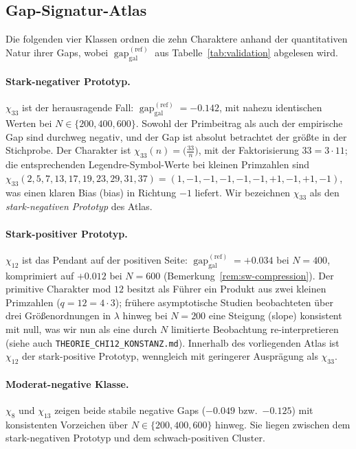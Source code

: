 \documentclass[a4paper,10pt,twocolumn]{article}
\theoremstyle{definition}
\theoremstyle{remark}
\newcommand{\gap}{\operatorname{gap}}
\newcommand{\chifn}{\chi}
\begin{document}
\subsection{Gap-Signatur-Atlas}
\label{sec:gapsig}

Die folgenden vier Klassen ordnen die zehn Charaktere anhand der
quantitativen Natur ihrer Gaps, wobei $\gap_{\mathrm{gal}}^{(\mathrm{ref})}$ aus
Tabelle~\ref{tab:validation} abgelesen wird.

\paragraph{Stark-negativer Prototyp.}
$\chifn_{33}$ ist der herausragende Fall:
$\gap_{\mathrm{gal}}^{(\mathrm{ref})}=-0.142$, mit nahezu identischen Werten bei
$N\in\{200,400,600\}$. Sowohl der Primbeitrag als auch der empirische Gap
sind durchweg negativ, und der Gap ist absolut betrachtet der größte
in der Stichprobe. Der Charakter ist
$\chifn_{33}(n)=\bigl(\tfrac{33}{n}\bigr)$, mit der Faktorisierung
$33=3\cdot 11$; die entsprechenden Legendre-Symbol-Werte bei kleinen
Primzahlen sind $\chifn_{33}(2,5,7,13,17,19,23,29,31,37)=
(1,-1,-1,-1,-1,-1,+1,-1,+1,-1)$, was einen klaren Bias (bias) in Richtung
$-1$ liefert. Wir bezeichnen $\chifn_{33}$ als den \emph{stark-negativen
Prototyp} des Atlas.

\paragraph{Stark-positiver Prototyp.}
$\chifn_{12}$ ist das Pendant auf der positiven Seite:
$\gap_{\mathrm{gal}}^{(\mathrm{ref})}=+0.034$ bei $N=400$, komprimiert auf $+0.012$ bei
$N=600$ (Bemerkung~\ref{rem:sw-compression}). Der primitive Charakter
mod $12$ besitzt als Führer ein Produkt aus zwei kleinen Primzahlen ($q=12=
4\cdot 3$); frühere asymptotische Studien \cite{AsymptoticScan} beobachteten
über drei Größenordnungen in $\lambda$ hinweg bei $N=200$ eine Steigung (slope) konsistent mit null,
was wir nun als eine durch $N$ limitierte
Beobachtung re-interpretieren (siehe auch \texttt{THEORIE\_CHI12\_KONSTANZ.md}). Innerhalb
des vorliegenden Atlas ist $\chifn_{12}$ der stark-positive Prototyp,
wenngleich mit geringerer Ausprägung als $\chifn_{33}$.

\paragraph{Moderat-negative Klasse.}
$\chifn_8$ und $\chifn_{13}$ zeigen beide stabile negative Gaps
($-0.049$ bzw.\ $-0.125$) mit konsistenten Vorzeichen über
$N\in\{200,400,600\}$ hinweg. Sie liegen zwischen dem stark-negativen
Prototyp und dem schwach-positiven Cluster.
\end{document}
